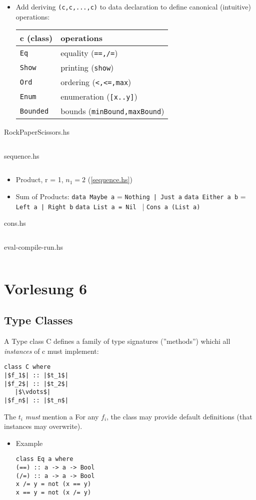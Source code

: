 \documentclass{article}
\newcommand{\Haskell}[1]{\texttt{#1}}
\begin{document}
\begin{itemize}
\item Add deriving \Haskell{(c,c,...,c)} to data declaration to define canonical (intuitive) operations:\\
\begin{tabular}{l|l}
c (class)&operations\\ \hline
\Haskell{Eq}&equality (\Haskell{==,/=})\\
\Haskell{Show}&printing (\Haskell{show})\\
\Haskell{Ord}&ordering  (\Haskell{<,<=,max})\\
\Haskell{Enum}&enumeration (\Haskell{[x..y]})\\
\Haskell{Bounded}& bounds (\Haskell{minBound,maxBound})
\end{tabular}
\end{itemize}
\begin{listing}[h!]
\caption{RockPaperScissors.hs}
\inputminted{Haskell}{RockPaperScissor.hs}
\end{listing}
\begin{listing}[h!]\label{sequence.hs}
\caption{sequence.hs}
\inputminted{Haskell}{sequence.hs}
\end{listing}
\begin{itemize}
\item Product, r = 1, $n_1 = 2$ (\ref{sequence.hs})
\item Sum of Products:
\subitem \Haskell{data Maybe a} = \Haskell{Nothing | Just a}
\subitem \Haskell{data Either a b} = \Haskell{Left a | Right b}
\subitem \Haskell{data List a = Nil} 
\subitem \phantom{List a}\ | \Haskell{Cons a (List a)}
\end{itemize}
\begin{listing}[h!]
\caption{cons.hs}
\inputminted{Haskell}{cons.hs}
\end{listing}
\begin{listing}[h!]
\caption{eval-compile-run.hs}
\inputminted{Haskell}{eval-compile-run.hs}
\end{listing}
\clearpage
\section{Vorlesung 6}
\subsection{Type Classes}
A Type class C defines a family of type signatures (''methods'') whichi all \emph{instances} of c must implement:\\
\begin{verbatim}
class C where
|$f_1$| :: |$t_1$|
|$f_2$| :: |$t_2$|
   |$\vdots$|
|$f_n$| :: |$t_n$|
\end{verbatim}
The  $t_i$ \emph{must} mention a For any $f_i$, the class may provide default definitions (that instances may overwrite).\\
\begin{itemize}
\item Example
\begin{verbatim}
class Eq a where 
(==) :: a -> a -> Bool
(/=) :: a -> a -> Bool
x /= y = not (x == y)
x == y = not (x /= y)
\end{verbatim}
\end{itemize}
\end{document}
